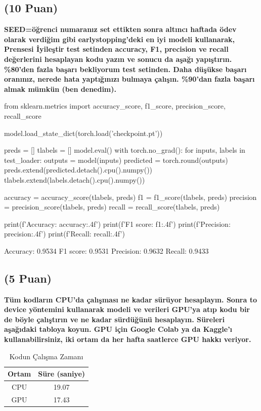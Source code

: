 \documentclass[11pt]{article}
\begin{document}
\subsection{(10 Puan)} \textbf{SEED=öğrenci numaranız set ettikten sonra altıncı haftada ödev olarak verdiğim gibi earlystopping'deki en iyi modeli kullanarak, Prensesi İyileştir test setinden accuracy, F1, precision ve recall değerlerini hesaplayan kodu yazın ve sonucu da aşağı yapıştırın. \%80'den fazla başarı bekliyorum test setinden. Daha düşükse başarı oranınız, nerede hata yaptığınızı bulmaya çalışın. \%90'dan fazla başarı almak mümkün (ben denedim).}

\begin{python}
from sklearn.metrics import accuracy_score, f1_score, precision_score, recall_score

model.load_state_dict(torch.load('checkpoint.pt'))

preds = []
tlabels = []
model.eval()
with torch.no_grad():
    for inputs, labels in test_loader:
        outputs = model(inputs)
        predicted = torch.round(outputs)
        preds.extend(predicted.detach().cpu().numpy())
        tlabels.extend(labels.detach().cpu().numpy())

accuracy = accuracy_score(tlabels, preds)
f1 = f1_score(tlabels, preds)
precision = precision_score(tlabels, preds)
recall = recall_score(tlabels, preds)

print(f'Accuracy: {accuracy:.4f}')
print(f'F1 score: {f1:.4f}')
print(f'Precision: {precision:.4f}')
print(f'Recall: {recall:.4f}')
\end{python}

Accuracy: 0.9534
F1 score: 0.9531
Precision: 0.9632
Recall: 0.9433

\subsection{(5 Puan)} \textbf{Tüm kodların CPU'da çalışması ne kadar sürüyor hesaplayın. Sonra to device yöntemini kullanarak modeli ve verileri GPU'ya atıp kodu bir de böyle çalıştırın ve ne kadar sürdüğünü hesaplayın. Süreleri aşağıdaki tabloya koyun. GPU için Google Colab ya da Kaggle'ı kullanabilirsiniz, iki ortam da her hafta saatlerce GPU hakkı veriyor.}

\begin{table}[ht!]
    \centering
    \caption{Kodun Çalışma Zamanı}
    \begin{tabular}{c|c}
        Ortam & Süre (saniye) \\\hline
        CPU & 19.07 \\
        GPU & 17.43 \\
    \end{tabular}
    \label{tab:my_table}
\end{table}
\end{document}
